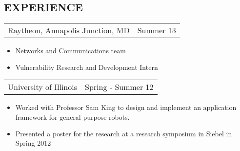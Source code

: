 \documentclass[margin]{res}
\begin{document}
\begin{resume}
\section{EXPERIENCE}
\begin{tabular}{p{3in} r} %
                  Raytheon, Annapolis Junction, MD &  Summer 13
                  \end{tabular}
                   \begin{itemize} \itemsep -2pt %
                    \item Networks and Communications team
                    \item Vulnerability Research and Development Intern
		   \end{itemize}
		 \begin{tabular}{p{3in} r}
                  University of Illinois &  Spring - Summer 12
                 \end{tabular}
		  \begin{itemize} \itemsep -2pt
                   \item Worked with Professor Sam King to design
                     and implement an application framework for
                     general purpose robots.
                   \item Presented a poster for
                     the research at a research symposium in Siebel in
                     Spring 2012
                  \end{itemize}

\end{resume}
\end{document}
